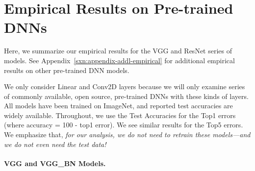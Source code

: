 
\section{Empirical Results on Pre-trained DNNs}
\label{sxn:emp}

Here, we summarize our empirical results for the VGG and ResNet series of models.
See Appendix~\ref{sxn:appendix-addl-empirical} for additional empirical results on other pre-trained DNN models.

We only consider Linear and Conv2D layers because we will only examine series of commonly available, open source, pre-trained DNNs with these kinds of layers. 
All models have been trained on ImageNet, and reported test accuracies are widely available. 
Throughout, we use the Test Accuracies for the Top1 errors (where accuracy = 100 - top1 error).
We see similar results for the Top5 errors.
We emphasize that, \emph{for our analysis, we do not need to retrain these models---and we do not even need the test data!}

\paragraph{VGG and VGG\_BN Models.}

